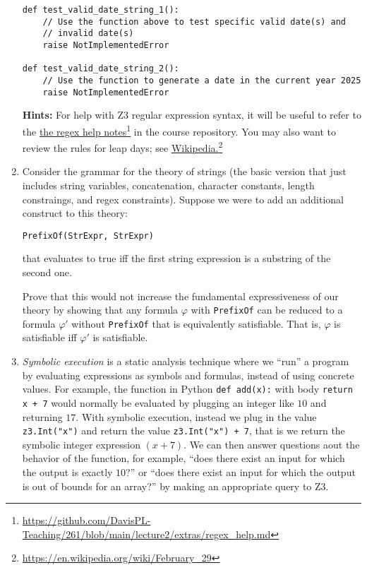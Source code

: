 \documentclass{article}
\newcommand{\visiblehref}[2]{\href{#1}{#2}\footnote{\url{#1}}}
\begin{document}
\begin{enumerate}
\begin{verbatim}
def test_valid_date_string_1():
    // Use the function above to test specific valid date(s) and
    // invalid date(s)
    raise NotImplementedError

def test_valid_date_string_2():
    // Use the function to generate a date in the current year 2025
    raise NotImplementedError
\end{verbatim}

\textbf{Hints:}
For help with Z3 regular expression syntax, it will be useful to refer to the \visiblehref{https://github.com/DavisPL-Teaching/261/blob/main/lecture2/extras/regex\_help.md}{the regex help notes} in the course repository.
You may also want to review the rules for leap days; see \visiblehref{https://en.wikipedia.org/wiki/February\_29}{Wikipedia.}

\item
Consider the grammar for the theory of strings (the basic version that just includes string variables, concatenation, character constants, length constraings, and regex constraints).
Suppose we were to add an additional construct to this theory:
\begin{center}
\texttt{PrefixOf(StrExpr, StrExpr)}
\end{center}
that evaluates to true iff the first string expression is a substring of the second one.

Prove that this would not increase the fundamental expressiveness of our theory by showing that
any formula $\varphi$ with \texttt{PrefixOf} can be reduced to a formula $\varphi'$ without \texttt{PrefixOf} that is equivalently satisfiable.
That is, $\varphi$ is satisfiable iff $\varphi'$ is satisfiable.

\item
\emph{Symbolic execution} is a static analysis technique where we ``run'' a program by evaluating expressions as symbols and formulas, instead of using concrete values.
For example, the function in Python \texttt{def add(x):} with body \texttt{return x + 7} would normally be evaluated
by plugging an integer like $10$ and returning $17$. With symbolic execution, instead we plug in the value
\texttt{z3.Int("x")} and return the value \texttt{z3.Int("x") + 7}, that is we return the symbolic integer expression $(x + 7)$. We can then answer questions aout the behavior of the function, for example, ``does there exist an input for which the output is exactly $10$?'' or ``does there exist an input for which the output is out of bounds for an array?'' by making an appropriate query to Z3.


\end{enumerate}
\end{document}
